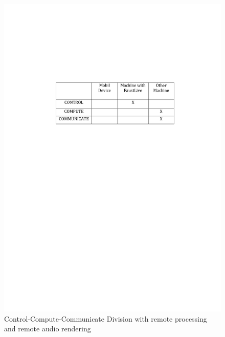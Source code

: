 \documentclass[a4paper]{article}
\begin{document}
\begin{figure}[!h]
\begin{center}
\includegraphics[width=0.7\columnwidth]{images/7CCC}
\caption{Control-Compute-Communicate Division with remote processing and remote audio rendering}
\label{fig:7CCC}
\end{center}
\end{figure}
\end{document}
